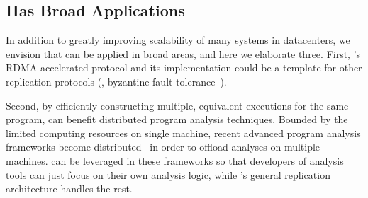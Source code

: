 






\subsection{\xxx Has Broad Applications}\label{sec:apps}

In addition to greatly improving \paxos scalability of many systems in 
datacenters, we envision that \xxx can be applied in broad areas, and here we 
elaborate three. First, \xxx's RDMA-accelerated \paxos protocol and its 
implementation could be a template for other replication protocols (\eg, 
byzantine fault-tolerance~\cite{zyzzyva:sosp07,pbft:osdi99}). 



Second, by efficiently constructing multiple, equivalent executions for the 
same program, \xxx can benefit distributed program analysis techniques. Bounded 
by the limited computing resources on single machine, recent advanced 
program analysis frameworks become 
distributed~\cite{decouple:usenix08, speck:asplos08, 
shadowreplica:ccs13, wester:parallelizing:asplos13,repframe:apsys15} in order to 
offload analyses on multiple machines. \xxx can be leveraged in these 
frameworks so that developers of analysis tools can just focus on their own 
analysis logic, while \xxx's general replication architecture handles the rest.

